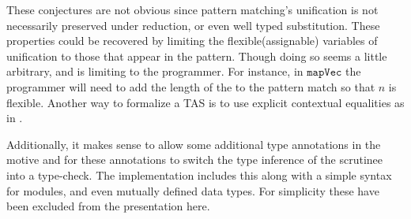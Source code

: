 These conjectures are not obvious since pattern matching's unification is not necessarily preserved under reduction, or even well typed substitution.
These properties could be recovered by limiting the flexible(assignable) variables of unification to those that appear in the pattern.
Though doing so seems a little arbitrary, and is limiting to the programmer.
For instance, in $\mathtt{mapVec}$ the programmer will need to add the length of the \Vect{} to the pattern match so that $n$ is flexible.
Another way to formalize a \ac{TAS} is to use explicit contextual equalities as in \cite{sjoberg2015dependently}.

Additionally, it makes sense to allow some additional type annotations in the motive and for these annotations to switch the type inference of the scrutinee into a type-check.
The implementation includes this along with a simple syntax for modules, and even mutually defined data types.
For simplicity these have been excluded from the presentation here.